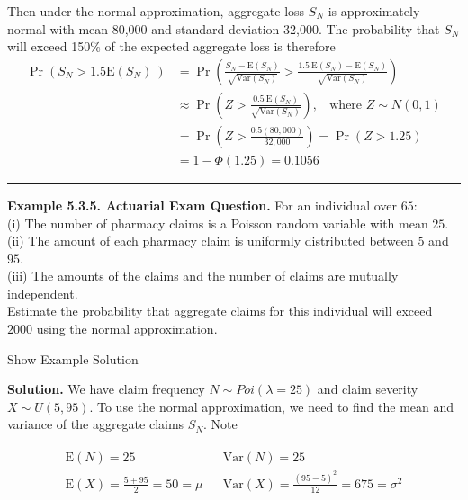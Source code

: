 \documentclass[]{book}
\theoremstyle{definition}
\theoremstyle{definition}
\theoremstyle{definition}
\theoremstyle{remark}
\begin{document}
Then under the normal approximation, aggregate loss \(S_N\) is
approximately normal with mean 80,000 and standard deviation 32,000. The
probability that \(S_N\) will exceed 150\(\%\) of the expected aggregate
loss is therefore \[\begin{aligned}
\Pr(S_N>1.5 \mathrm{E}(S_N)~) &= \Pr \left( \frac{S_N - \mathrm{E} (S_N)}{\sqrt{\mathrm{Var}(S_N)}} > \frac{1.5 ~\mathrm{E}(S_N) - \mathrm{E} (S_N)}{\sqrt{\mathrm{Var}(S_N)}} \right) \\
&\approx \Pr \left( Z > \frac{0.5~ \mathrm{E}(S_N)}{\sqrt{\mathrm{Var}(S_N)} } \right), ~~~~ \text{where } Z\sim N(0,1) \\
&= \Pr \left( Z > \frac{0.5(80,000)}{32,000} \right) = \Pr( Z > 1.25) \\
&= 1-\Phi(1.25) = 0.1056
\end{aligned}\]

\begin{center}\rule{0.5\linewidth}{\linethickness}\end{center}

\textbf{Example 5.3.5. Actuarial Exam Question.} For an individual over
\(65\):\\
(i) The number of pharmacy claims is a Poisson random variable with mean
\(25\).\\
(ii) The amount of each pharmacy claim is uniformly distributed between
\(5\) and \(95\).\\
(iii) The amounts of the claims and the number of claims are mutually
independent.\\
Estimate the probability that aggregate claims for this individual will
exceed \(2000\) using the normal approximation.

Show Example Solution

\hypertarget{toggleExampleAggLoss.3.5}{}
\textbf{Solution.} We have claim frequency \(N \sim Poi(\lambda = 25)\)
and claim severity \(X \sim U \left(5, 95 \right)\). To use the normal
approximation, we need to find the mean and variance of the aggregate
claims \(S_N\). Note

\[\begin{matrix}
\begin{array}{lll}
\mathrm{E} (N) = 25 & & \mathrm{Var} (N) = 25\\
\mathrm{E}(X) = \frac{5+95}{2} = 50 = \mu & & \mathrm{Var}(X) = \frac{(95-5)^2}{12} = 675 = \sigma^2\\
\end{array}
\end{matrix}\]
\end{document}
